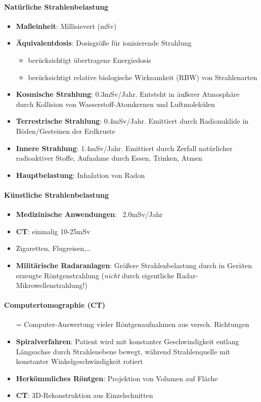 \paragraph{Natürliche Strahlenbelastung}
\begin{itemize}
  \item \textbf{Maßeinheit}: Millisievert (mSv)
  \item \textbf{Äquivalentdosis}: Dosisgröße für ionisierende Strahlung
  \begin{itemize}
    \item berücksichtigt übertragene Energiedosis
    \item berücksichtigt relative biologische Wirksamkeit (RBW) von Strahlenarten
  \end{itemize}
  \item \textbf{Kosmische Strahlung}: 0.3mSv/Jahr. Entsteht in äußerer Atmosphäre durch Kollision von Wasserstoff-Atomkernen und Luftmolekülen
  \item \textbf{Terrestrische Strahlung}: 0.4mSv/Jahr. Emittiert durch Radionuklide in Böden/Gesteinen der Erdkruste
  \item \textbf{Innere Strahlung}: 1.4mSv/Jahr. Emittiert durch Zerfall natürlicher radioaktiver Stoffe, Aufnahme durch Essen, Trinken, Atmen
  \item \textbf{Hauptbelastung}: Inhalation von Radon
\end{itemize}

\paragraph{Künstliche Strahlenbelastung}
\begin{itemize}
  \item \textbf{Medizinische Anwendungen}: ~2.0mSv/Jahr
  \item \textbf{CT}: einmalig 10-25mSv
  \item Zigaretten, Flugreisen,\dots
  \item \textbf{Militärische Radaranlagen}: Größere Strahlenbelastung durch in Geräten erzeugte Röntgenstrahlung (\emph{nicht} durch eigentliche Radar-Mikrowellenstrahlung!)
\end{itemize}

\paragraph{Computertomographie (CT)}
\begin{itemize}
  \item[=] Computer-Auswertung vieler Röntgenaufnahmen aus versch. Richtungen
  \item \textbf{Spiralverfahren}: Patient wird mit konstanter Geschwindigkeit entlang Längsachse durch Strahlenebene bewegt, während Strahlenquelle mit konstanter Winkelgeschwindigkeit rotiert
  \item \textbf{Herkömmliches Röntgen}: Projektion von Volumen auf Fläche
  \item \textbf{CT}: 3D-Rekonstruktion aus Einzelschnitten
\end{itemize}

